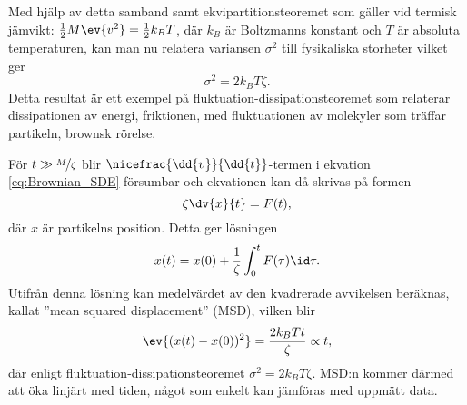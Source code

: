 Med hjälp av detta samband samt ekvipartitionsteoremet som gäller vid termisk jämvikt: $\frac{1}{2}M\ev{v^2}=\frac{1}{2}k_BT$, där $k_B$ är Boltzmanns konstant och $T$ är absoluta temperaturen, kan man nu relatera variansen $\sigma^2$ till fysikaliska storheter vilket ger 
\begin{equation}
    \sigma^2 = 2k_BT\zeta.
\end{equation}
Detta resultat är ett exempel på fluktuation-dissipationsteoremet som relaterar dissipationen av energi, friktionen, med fluktuationen av molekyler som träffar partikeln,  brownsk rörelse. 

För $t \gg \nicefrac{M}{\zeta}$ blir $\nicefrac{\dd{v}}{\dd{t}}$-termen i ekvation \eqref{eq:Brownian_SDE}  försumbar och ekvationen kan då skrivas på formen
\begin{equation}
    \zeta \dv{x}{t}=F(t),
\end{equation}
där $x$ är partikelns position. Detta ger lösningen
\begin{equation}
    x(t)=x(0)+\frac{1}{\zeta} \int^t_0 F(\tau)\id\tau.
\end{equation}
Utifrån denna lösning kan medelvärdet av den kvadrerade avvikelsen beräknas, kallat ''mean squared displacement'' (MSD), vilken blir 
\begin{equation}\label{eq:MSD_brown}
    \ev{(x(t)-x(0))^2}=\frac{2k_BTt}{\zeta} \propto t,
\end{equation}
där enligt fluktuation-dissipationsteoremet  $\sigma^2=2k_BT\zeta$. MSD:n kommer därmed att öka linjärt med tiden, något som enkelt kan jämföras med uppmätt data.




